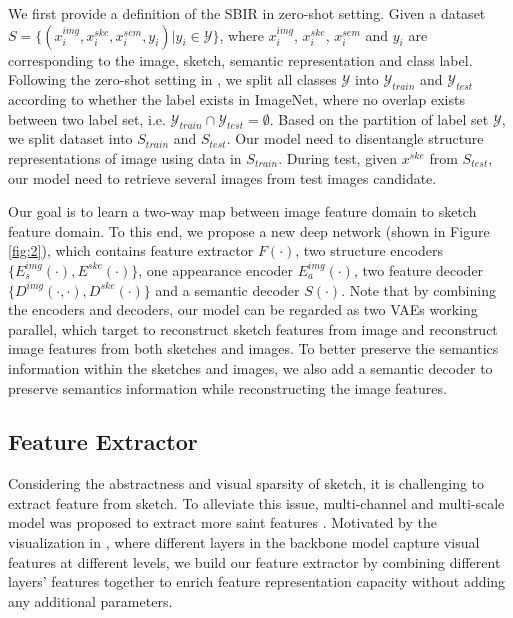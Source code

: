 \documentclass[10pt,twocolumn,letterpaper]{article}
\begin{document}
We first provide a definition of the SBIR in zero-shot setting. 
Given a dataset $S=\{(x_i^{img}, x_i^{ske}, x_i^{sem}, y_i)|y_i \in \mathcal{Y}\}$, where $x_i^{img}$, $x_i^{ske}$, $x_i^{sem}$ and $y_i$ are corresponding to the image, sketch, semantic representation and class label. 
Following the zero-shot setting in \cite{yelamarthi2018zero}, we split all classes $\mathcal{Y}$ into $\mathcal{Y}_{train}$ and $\mathcal{Y}_{test}$ according to whether the label exists in ImageNet\cite{deng2009imagenet}, where no overlap exists between two label set, i.e. $\mathcal{Y}_{train} \cap \mathcal{Y}_{test} = \emptyset$. 
Based on the partition of label set $\mathcal{Y}$, we split dataset into $S_{train}$ and $S_{test}$. 
Our model need to disentangle structure representations of image using data in $S_{train}$. 
During test, given $x^{ske}$ from $S_{test}$, our model need to retrieve several images from test images candidate.

Our goal is to learn a two-way map between image feature domain to sketch feature domain. 
To this end, we propose a new deep network (shown in Figure \ref{fig:2}), which contains feature extractor $F(\cdot)$, two structure encoders $\{E_{s}^{img}(\cdot), E^{ske}(\cdot)\}$, one appearance encoder $E^{img}_{a}(\cdot)$, two feature decoder $\{D^{img}(\cdot, \cdot), D^{ske}(\cdot)\}$ and a semantic decoder $S(\cdot)$. 
Note that by combining the encoders and decoders, our model can be regarded as two VAEs working parallel, which target to reconstruct sketch features from image and reconstruct image features from both sketches and images. 
To better preserve the semantics information within the sketches and images, we also add a semantic decoder to preserve semantics information while reconstructing the image features.

\subsection{Feature Extractor} \label{3.2}
Considering the abstractness and visual sparsity of sketch, it is challenging to extract feature from sketch. 
To alleviate this issue, multi-channel and multi-scale model was proposed to extract more saint features \cite{yu2017sketch}. 
Motivated by the visualization in \cite{zeiler2014visualizing}, where different layers in the backbone model capture visual features at different levels, we build our feature extractor by combining different layers' features together to enrich feature representation capacity without adding any additional parameters.
\end{document}
